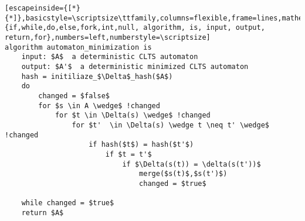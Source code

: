 \renewcommand{\ttdefault}{pcr}
\begin{lstlisting}[escapeinside={[*}{*]},basicstyle=\scriptsize\ttfamily,columns=flexible,frame=lines,mathescape=true,xleftmargin=3.0ex,keywordstyle=\textbf,morekeywords={if,while,do,else,fork,int,null, algorithm, is, input, output, return,for},numbers=left,numberstyle=\scriptsize]
algorithm automaton_minimization is
	input: $A$  a deterministic CLTS automaton
	output: $A'$  a deterministic minimized CLTS automaton
	hash = initiliaze_$\Delta$_hash($A$)
	do
		changed = $false$
		for $s \in A \wedge$ !changed
			for $t \in \Delta(s) \wedge$ !changed
				for $t'  \in \Delta(s) \wedge t \neq t' \wedge$ !changed
					if hash($t$) = hash($t'$) 
						if $t = t'$
							if $\Delta(s(t)) = \delta(s(t'))$ 
								merge($s(t)$,$s(t')$)
								changed = $true$
		
	while changed = $true$
	return $A$
\end{lstlisting}